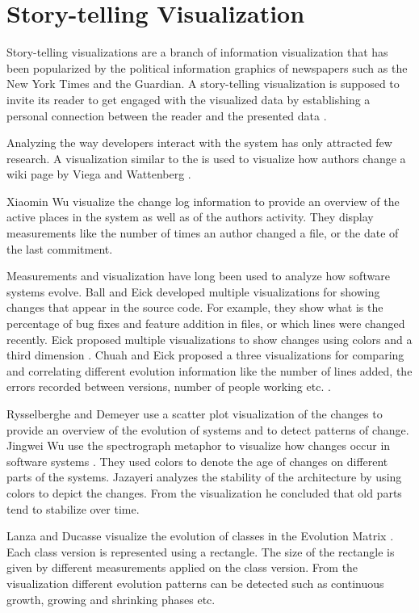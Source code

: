 \section{Story-telling Visualization}

Story-telling visualizations are a branch of information visualization that has been popularized by the political information graphics of newspapers such as the New York Times and the Guardian. A story-telling visualization is supposed to invite its reader to get engaged with the visualized data by establishing a personal connection between the reader and the presented data \cite{Sege10a}. 

Analyzing the way developers interact with the system has only attracted few research. A visualization similar to the \omap is used to visualize how authors change a wiki page by Viega and Wattenberg \cite{Vieg04a}.

Xiaomin Wu \etal visualize \cite{Wu04b} the change log information to provide an overview of the active places in the system as well as of the authors activity. They display measurements like the number of times an author changed a file, or the date of the last commitment.

Measurements and visualization have long been used to analyze how software systems evolve.
%
Ball and Eick \cite{Ball96a} developed multiple visualizations for showing changes that appear in the source code. For example, they show what is the percentage of bug fixes and feature addition in files, or which lines were changed recently.
%
Eick \etal proposed multiple visualizations to show changes using colors and a third dimension \cite{Eick02a}.
%
Chuah and Eick proposed a three visualizations for comparing and correlating different evolution information like the number of lines added, the errors recorded between versions, number of people working etc. \cite{Chua98a}.

Rysselberghe and Demeyer use a scatter plot visualization of the changes  to provide an overview of the evolution of systems and to detect patterns of change\cite{Ryss04a}.
%
Jingwei Wu \etal use the spectrograph metaphor to visualize how changes occur in software systems \cite{Wu04a}. They used colors to denote the age of changes on different parts of the systems.
%
Jazayeri analyzes the stability of the architecture \cite{Jaza02a} by using colors to depict the changes. From the visualization he concluded that old parts tend to stabilize over time.

Lanza and Ducasse visualize the evolution of classes in the Evolution Matrix \cite{Lanz02a}. Each class version is represented using a rectangle. The size of the rectangle is given by different measurements applied on the class version. From the visualization different evolution patterns can be detected such as continuous growth, growing and shrinking phases etc.

